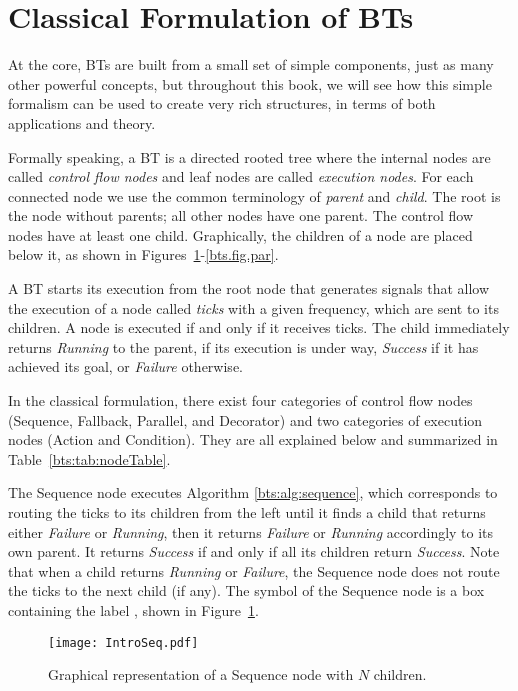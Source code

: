 \section{Classical Formulation of BTs}
\label{sec:classicalBT}

At the core, BTs are built from a small set of simple components, just as many other powerful concepts, but throughout this book, we will see how this simple formalism can be used to create very rich structures, in terms of both applications and theory.

Formally speaking, a BT is a directed rooted tree where the internal nodes  are called \emph{control flow nodes} and leaf nodes are called \emph{execution nodes}. For each connected node we use the common terminology of  \emph{parent} and \emph{child}. The root is the node without parents; all other nodes have one parent. The control flow nodes have at least one child. Graphically, the children of a node are placed below it, as shown in Figures~\ref{bts.fig.seq}-\ref{bts.fig.par}.

A BT starts its execution from the root node that generates signals that allow the execution of a node called \emph{ticks} with a given frequency, which are sent to its children. A node is executed if and only if it receives ticks. The child immediately returns \emph{Running} to the parent,   if its execution is under way, \emph{Success} if it has achieved its goal, or \emph{Failure} otherwise.

In the classical formulation, there exist four categories of control flow nodes (Sequence, Fallback, Parallel, and Decorator) and two categories of execution nodes (Action and Condition). They  are all explained below and summarized in Table~\ref{bts:tab:nodeTable}.



The Sequence node executes Algorithm \ref{bts:alg:sequence},
which corresponds to routing the ticks to its children from the left until it finds a child that returns either \emph{Failure} or \emph{Running}, then it returns \emph{Failure} or \emph{Running} accordingly to its own parent. It returns \emph{Success} if and only if all its children return \emph{Success}. Note that when a child returns \emph{Running} or \emph{Failure}, the Sequence node does not route the ticks to the next child (if any). The symbol of the Sequence node is a box containing the label \say{$\rightarrow$}, shown in Figure~\ref{bts.fig.seq}.
\begin{figure}[h]
\centering
\texttt{[image: IntroSeq.pdf]}
\caption{Graphical representation of a Sequence node with $N$ children.}
\label{bts.fig.seq}
\end{figure}

